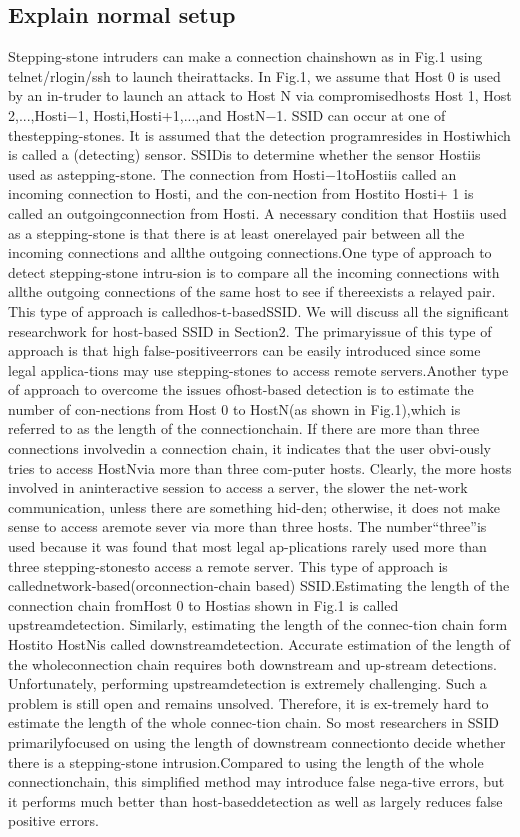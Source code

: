 \documentclass[conference]{IEEEtran}\usepackage[]{graphicx}\usepackage[]{color}
\begin{document}
\subsection{Explain normal setup}
Stepping-stone intruders can make a connection chainshown as in Fig.1 using telnet/rlogin/ssh to launch theirattacks. In Fig.1, we assume that Host 0 is used by an in-truder to launch an attack to Host N via compromisedhosts Host 1, Host 2,...,Hosti−1, Hosti,Hosti+1,...,and  HostN−1.  SSID  can  occur  at  one  of  thestepping-stones. It is assumed that the detection programresides in Hostiwhich is called a (detecting) sensor. SSIDis to determine whether the sensor Hostiis used as astepping-stone. The connection from Hosti−1toHostiis called an incoming connection to Hosti, and the con-nection from Hostito Hosti+ 1 is called an outgoingconnection from Hosti. A necessary condition that Hostiis used as a stepping-stone is that there is at least onerelayed pair between all the incoming connections and allthe outgoing connections.One type of approach to detect stepping-stone intru-sion is to compare all the incoming connections with allthe outgoing connections of the same host to see if thereexists a relayed pair. This type of approach is calledhos-t-basedSSID. We will discuss all the significant researchwork for host-based SSID in Section2. The primaryissue of this type of approach is that high false-positiveerrors can be easily introduced since some legal applica-tions may use stepping-stones to access remote servers.Another type of approach to overcome the issues ofhost-based detection is to estimate the number of con-nections from Host 0 to HostN(as shown in Fig.1),which is referred to as the length of the connectionchain. If there are more than three connections involvedin a connection chain, it indicates that the user obvi-ously tries to access HostNvia more than three com-puter hosts. Clearly, the more hosts involved in aninteractive session to access a server, the slower the net-work communication, unless there are something hid-den; otherwise, it does not make sense to access aremote sever via more than three hosts. The number“three”is used because it was found that most legal ap-plications rarely used more than three stepping-stonesto access a remote server. This type of approach is callednetwork-based(orconnection-chain based) SSID.Estimating the length of the connection chain fromHost 0 to Hostias shown in Fig.1 is called upstreamdetection. Similarly, estimating the length of the connec-tion chain form Hostito HostNis called downstreamdetection. Accurate estimation of the length of the wholeconnection chain requires both downstream and up-stream detections. Unfortunately, performing upstreamdetection is extremely challenging. Such a problem is still open and remains unsolved. Therefore, it is ex-tremely hard to estimate the length of the whole connec-tion  chain. So  most  researchers  in  SSID  primarilyfocused on using the length of downstream connectionto decide whether there is a stepping-stone intrusion.Compared to using the length of the whole connectionchain, this simplified method may introduce false nega-tive errors, but it performs much better than host-baseddetection as well as largely reduces false positive errors.
\end{document}
